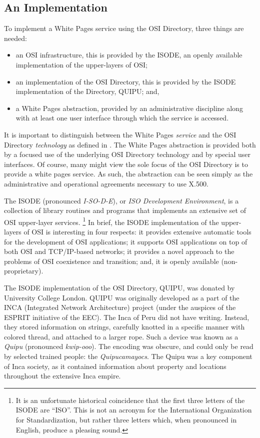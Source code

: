 \subsection	{An Implementation}
To implement a White Pages service using the OSI Directory,
three things are needed:
\begin{itemize}
\item	an OSI infrastructure,
	this is provided by the ISODE,
	an openly available implementation of the upper-layers of OSI;

\item	an implementation of the OSI Directory,
	this is provided by the ISODE implementation of the Directory,
	QUIPU;
	and,

\item	a White Pages abstraction,
	provided by an administrative discipline along with at least one user
	interface through which the service is accessed.
\end{itemize}
It is important to distinguish between the White Pages {\em service\/} and the
OSI Directory {\em technology} as defined in
\cite{ISO.Directory,CCITT.Directory}.
The White Pages abstraction is provided both by a focused use of the
underlying OSI Directory technology
and by special user interfaces.
Of course,
many might view the sole focus of the OSI Directory is to provide a white
pages service.
As such,
the abstraction can be seen simply as the administrative and operational
agreements necessary to use X.500.

The ISODE (pronounced {\em I-SO-D-E\/}),
or {\em ISO Development Environment}, is a collection of library
routines and programs that implements an extensive set of OSI upper-layer
services\cite{Open.Book}.%
\footnote{It is an unfortunate historical coincidence that the first three
letters of the ISODE are ``ISO''.
This is not an acronym for the International Organization for Standardization,
but rather three letters which,
when pronounced in English,
produce a pleasing sound.}
In brief,
the ISODE implementation of the upper-layers of OSI is interesting in four
respects:
it provides extensive automatic tools for the development of OSI applications;
it supports OSI applications on top of both OSI and TCP/IP-based networks;
it provides a novel approach to the problems of OSI coexistence
and transition;
and,
it is openly available (non-proprietary).

The ISODE implementation of the OSI Directory,
QUIPU\cite{QUIPU.Directory},
was donated by University College London.
QUIPU was originally developed as a part of the INCA
(Integrated Network Architecture) project
(under the auspices of the ESPRIT initiative of the EEC).
The Inca of Peru did not have writing.
Instead,
they stored information on strings,
carefully knotted in a specific manner with colored thread,
and attached to a larger rope.
Such a device was known as a {\em Quipu\/}
(pronounced {\em kwip-ooo}).
The encoding was obscure,
and could only be read by selected trained people:
the {\em Quipucamayocs}.
The Quipu was a key component of Inca society,
as it contained information about property and locations throughout
the extensive Inca empire.

